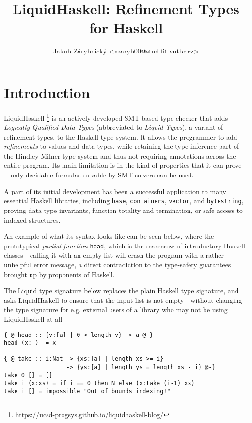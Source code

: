 \documentclass[11pt]{article}
\author{Jakub Zárybnický <xzaryb00@stud.fit.vutbr.cz>}
\date{}
\title{LiquidHaskell: Refinement Types for Haskell}
\begin{document}
\maketitle

\section{Introduction}
\label{sec:orgf39f30d}

LiquidHaskell \footnote{\url{https://ucsd-progsys.github.io/liquidhaskell-blog/}} is an actively-developed SMT-based type-checker that adds
\emph{Logically Qualified Data Types} (abbreviated to \emph{Liquid Types}), a variant of
refinement types, to the Haskell type system. It allows the programmer to add
\emph{refinements} to values and data types, while retaining the type inference part of
the Hindley-Milner type system and thus not requiring annotations across the
entire program. Its main limitation is in the kind of properties that it can
prove---only decidable formulas solvable by SMT solvers can be used.

A part of its initial development has been a successful application to many
essential Haskell libraries, including \texttt{base}, \texttt{containers}, \texttt{vector}, and \texttt{bytestring},
proving data type invariants, function totality and termination, or safe access
to indexed structures.

An example of what its syntax looks like can be seen below, where the
prototypical \emph{partial function} \texttt{head}, which is the scarecrow of introductory
Haskell classes---calling it with an empty list will crash the program with a
rather unhelpful error message, a direct contradiction to the type-safety
guarantees brought up by proponents of Haskell.

The Liquid type signature below replaces the plain Haskell type signature, and
asks LiquidHaskell to ensure that the input list is not empty---without changing
the type signature for e.g. external users of a library who may not be using
LiquidHaskell at all.

\begin{verbatim}
{-@ head :: {v:[a] | 0 < length v} -> a @-}
head (x:_)  = x

{-@ take :: i:Nat -> {xs:[a] | length xs >= i}
                  -> {ys:[a] | length ys = length xs - i} @-}
take 0 [] = []
take i (x:xs) = if i == 0 then N else (x:take (i-1) xs)
take i [] = impossible "Out of bounds indexing!"
\end{verbatim}
\end{document}
